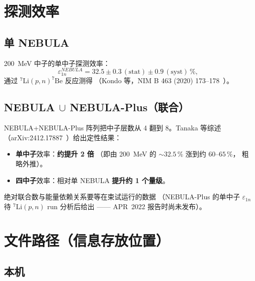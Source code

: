 \documentclass[a4paper,11pt]{ctexart}
\newcommand{\NEB}{NEBULA}
\newcommand{\NPL}{NEBULA-Plus}
\begin{document}
\section{探测效率}

\subsection{单 \NEB{}}

\SI{200}{MeV} 中子的单中子探测效率：
\[
\varepsilon_{1n}^{\NEB{}} = 32.5 \pm 0.3\,(\text{stat}) \pm 0.9\,(\text{syst})\,\%,
\]
通过 $^{7}\mathrm{Li}(p,n)^{7}\mathrm{Be}$ 反应测得
（Kondo 等，NIM B 463 (2020) 173--178~\cite{kondo2020nim}）。

\subsection{\NEB{} $\cup$ \NPL{}（联合）}

\NEB{}+\NPL{} 阵列把中子层数从 4 翻到 8。Tanaka 等综述
（arXiv:2412.17887~\cite{tanaka2024}）给出定性结果：

\begin{itemize}
  \item \textbf{单中子}效率：\textbf{约提升 2 倍}
        （即由 \SI{200}{MeV} 的 $\sim 32.5\,\%$ 涨到约 $60$--$65\,\%$，
        粗略外推）。
  \item \textbf{四中子}效率：相对单 \NEB{} \textbf{提升约 1 个量级}。
\end{itemize}

绝对联合数与能量依赖关系要等在束试运行的数据
（\NPL{} 的单中子 $\varepsilon_{1n}$ 待 $^{7}\mathrm{Li}(p,n)$
run 分析后给出 —— APR~2022 报告时尚未发布）。

\section{文件路径（信息存放位置）}
\label{sec:sources}

\subsection{本机}
\end{document}
